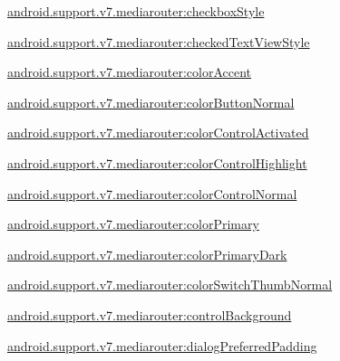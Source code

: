 {\ttfamily \hyperlink{classandroid_1_1support_1_1v7_1_1mediarouter_1_1R_1_1styleable_a2149fa776964dfd41a14357ea2f3c8c5}{android.\+support.\+v7.\+mediarouter\+:checkbox\+Style}}

{\ttfamily \hyperlink{classandroid_1_1support_1_1v7_1_1mediarouter_1_1R_1_1styleable_a3664100d2a81d9957c8aea792d6b8c56}{android.\+support.\+v7.\+mediarouter\+:checked\+Text\+View\+Style}}

{\ttfamily \hyperlink{classandroid_1_1support_1_1v7_1_1mediarouter_1_1R_1_1styleable_a8579a8f66a19549046fe28ca6a0b001b}{android.\+support.\+v7.\+mediarouter\+:color\+Accent}}

{\ttfamily \hyperlink{classandroid_1_1support_1_1v7_1_1mediarouter_1_1R_1_1styleable_a2e67b376287180b911f79e22da40a678}{android.\+support.\+v7.\+mediarouter\+:color\+Button\+Normal}}

{\ttfamily \hyperlink{classandroid_1_1support_1_1v7_1_1mediarouter_1_1R_1_1styleable_a4af1f042778d9a39c7755e8d349bfbe2}{android.\+support.\+v7.\+mediarouter\+:color\+Control\+Activated}}

{\ttfamily \hyperlink{classandroid_1_1support_1_1v7_1_1mediarouter_1_1R_1_1styleable_a3101d4c220b1624630e177adbcb5bed1}{android.\+support.\+v7.\+mediarouter\+:color\+Control\+Highlight}}

{\ttfamily \hyperlink{classandroid_1_1support_1_1v7_1_1mediarouter_1_1R_1_1styleable_a5fa81c05a9dc3325bf0d8bb56ae34321}{android.\+support.\+v7.\+mediarouter\+:color\+Control\+Normal}}

{\ttfamily \hyperlink{classandroid_1_1support_1_1v7_1_1mediarouter_1_1R_1_1styleable_a0c6a69062686746906fdbde03f24524b}{android.\+support.\+v7.\+mediarouter\+:color\+Primary}}

{\ttfamily \hyperlink{classandroid_1_1support_1_1v7_1_1mediarouter_1_1R_1_1styleable_a68da362e86b61e6a4cd581ac84979e66}{android.\+support.\+v7.\+mediarouter\+:color\+Primary\+Dark}}

{\ttfamily \hyperlink{classandroid_1_1support_1_1v7_1_1mediarouter_1_1R_1_1styleable_aa3284b705f7b27b8788c23ea647f66df}{android.\+support.\+v7.\+mediarouter\+:color\+Switch\+Thumb\+Normal}}

{\ttfamily \hyperlink{classandroid_1_1support_1_1v7_1_1mediarouter_1_1R_1_1styleable_a47c5659b0ee16f07cd6f1cf55cd650e3}{android.\+support.\+v7.\+mediarouter\+:control\+Background}}

{\ttfamily \hyperlink{classandroid_1_1support_1_1v7_1_1mediarouter_1_1R_1_1styleable_a12d698145612528765b887b3bbbe63bb}{android.\+support.\+v7.\+mediarouter\+:dialog\+Preferred\+Padding}}

